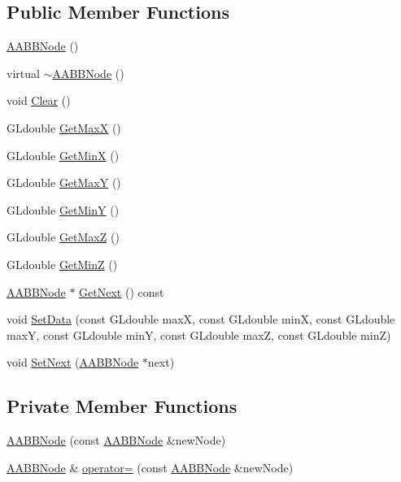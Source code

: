 \subsection*{Public Member Functions}
\begin{DoxyCompactItemize}
\item 
\hyperlink{class_a_a_b_b_node_ab44974b730878548779dcc724b8a5be7}{A\+A\+B\+B\+Node} ()
\item 
virtual \hyperlink{class_a_a_b_b_node_a9836982140490a8e86a9822dbc0d53e6}{$\sim$\+A\+A\+B\+B\+Node} ()
\item 
void \hyperlink{class_a_a_b_b_node_a1b1bafc601218c6b5870e430998e387f}{Clear} ()
\item 
G\+Ldouble \hyperlink{class_a_a_b_b_node_adb707da6d39fdae8230dd40f33a6cc85}{Get\+MaxX} ()
\item 
G\+Ldouble \hyperlink{class_a_a_b_b_node_ada7009629434897aefb2b58384ae91e2}{Get\+MinX} ()
\item 
G\+Ldouble \hyperlink{class_a_a_b_b_node_aca46418ff41fbadd321474617abe81e8}{Get\+MaxY} ()
\item 
G\+Ldouble \hyperlink{class_a_a_b_b_node_a1dfa67f00ed2e48487df020eb5a20fd0}{Get\+MinY} ()
\item 
G\+Ldouble \hyperlink{class_a_a_b_b_node_a86f9e03ef5e39913c520b00dd06541e6}{Get\+MaxZ} ()
\item 
G\+Ldouble \hyperlink{class_a_a_b_b_node_a9d8ab82f585a852cc45cb1d8b27188cf}{Get\+MinZ} ()
\item 
\hyperlink{class_a_a_b_b_node}{A\+A\+B\+B\+Node} $\ast$ \hyperlink{class_a_a_b_b_node_aeba066c64653e3a9d73e0b617a8b844c}{Get\+Next} () const 
\item 
void \hyperlink{class_a_a_b_b_node_a43c049985e68d0d7443dc7ba11c71979}{Set\+Data} (const G\+Ldouble maxX, const G\+Ldouble minX, const G\+Ldouble maxY, const G\+Ldouble minY, const G\+Ldouble maxZ, const G\+Ldouble minZ)
\item 
void \hyperlink{class_a_a_b_b_node_a2d624ad9c1241156af7a4dd96cbcd40f}{Set\+Next} (\hyperlink{class_a_a_b_b_node}{A\+A\+B\+B\+Node} $\ast$next)
\end{DoxyCompactItemize}
\subsection*{Private Member Functions}
\begin{DoxyCompactItemize}
\item 
\hyperlink{class_a_a_b_b_node_ae5599cabd1c7ff4437d979ba52c487f6}{A\+A\+B\+B\+Node} (const \hyperlink{class_a_a_b_b_node}{A\+A\+B\+B\+Node} \&new\+Node)
\item 
\hyperlink{class_a_a_b_b_node}{A\+A\+B\+B\+Node} \& \hyperlink{class_a_a_b_b_node_aa4302db47c66af98472bcf6f42c6ba65}{operator=} (const \hyperlink{class_a_a_b_b_node}{A\+A\+B\+B\+Node} \&new\+Node)
\end{DoxyCompactItemize}
